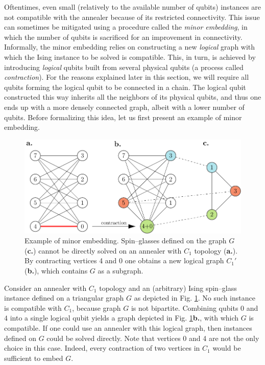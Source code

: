 Oftentimes, even small (relatively to the available number of qubits) instances
are not compatible with the annealer because of its restricted connectivity.
This issue can sometimes be mitigated using a procedure called the \emph{minor
  embedding}, in which the number of qubits is sacrificed for an improvement in
connectivity. Informally, the minor embedding relies on constructing a new
\emph{logical} graph with which the Ising instance to be solved is compatible.
This, in turn, is achieved by introducing \emph{logical} qubits built from
several physical qubits (a process called \emph{contraction}). For the reasons
explained later in this section, we will require all qubits forming the logical
qubit to be connected in a chain. The logical qubit constructed this way
inherits all the neighbors of its physical qubits, and thus one ends up with a
more densely connected graph, albeit with a lower number of qubits. Before
formalizing this idea, let us first present an example of minor embedding.

\begin{example}
  \label{ex:minor-embedding}
  \begin{figure}[b]
    \includegraphics[width=\textwidth]{figures/minor-embedding}
    \caption{
      Example of minor embedding. Spin--glasses defined on the graph $G$
      (\textbf{c.}) cannot be directly solved on an annealer with $C_1$ topology
      (\textbf{a.}). By contracting vertices 4 and 0 one obtains a new logical graph
      $C_1'$ (\textbf{b.}), which contains $G$ as a subgraph. }
    \label{fig:minor-embedding}
  \end{figure}

  Consider an annealer with $C_1$ topology and an (arbitrary) Ising spin--glass
  instance defined on a triangular graph $G$ as depicted in Fig.
  \ref{fig:minor-embedding}. No such instance is compatible with $C_1$, because
  graph $G$ is not bipartite. Combining qubits $0$ and $4$ into a single logical
  qubit yields a graph depicted in Fig. \ref{fig:minor-embedding}\textbf{b.},
  with which $G$ is compatible. If one could use an annealer with this logical
  graph, then instances defined on $G$ could be solved directly. Note that
  vertices 0 and 4 are not the only choice in this case. Indeed, every
  contraction of two vertices in $C_1$ would be sufficient to embed $G$.
\end{example}

